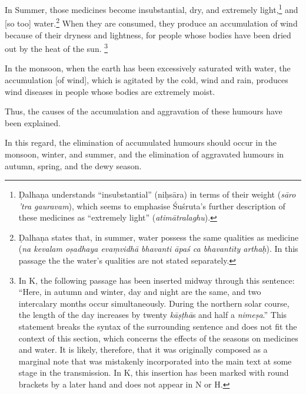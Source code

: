 \begin{translation}
In Summer, those medicines %
become insubstantial, dry, and extremely light,\footnote{%
    Ḍalhaṇa \citep[26]{vulgate} understands ``insubstantial'' (niḥsāra) in terms of their weight (\emph{sāro ’tra gauravam}), which seems to emphasise Śuśruta's further description of these medicines as ``extremely light'' (\emph{atimātralaghu}).} 
and [so too] water.\footnote{%
    Ḍalhaṇa \citep[26]{vulgate} states that, in summer, water possess the same qualities as medicine (\emph{na kevalam oṣadhaya evaṃvidhā bhavanti āpaś ca bhavantīty arthaḥ}). In this passage the  the water's qualities are not stated separately.}
When they are consumed, %
they produce an accumulation of wind because of their dryness and lightness, %
for people whose bodies have been dried out by the heat of the sun.%
    \footnote{%
    In K, the following passage has been inserted midway through this sentence: ``Here, in autumn and winter, day and night are the same, and two intercalary months occur simultaneously. During the northern solar course, the length of the day increases by twenty \emph{kāṣṭhā}s and half a \emph{nimeṣa}.'' This statement breaks the syntax of the surrounding sentence and does not fit the context of this section, which concerns the effects of the seasons on medicines and water. It is likely, therefore, that it was originally composed as a marginal note that was mistakenly incorporated into the main text at some stage in the transmission. In K, this insertion has been marked with round brackets by a later hand and does not appear in N or H.} %
  
In the monsoon, %
when the earth has been excessively saturated with water, %
the accumulation [of wind], which is agitated by the cold, wind and rain, %
produces wind diseases %
in people whose bodies are extremely moist. %

Thus, the causes of the accumulation and aggravation of these humours have been explained.

\item [12]
In this regard, the elimination of accumulated humours should occur in the monsoon, winter, and summer, and the elimination of aggravated humours in autumn, spring, and the dewy season. 


\end{translation}
